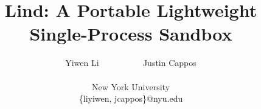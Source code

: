 \documentclass[letterpaper,twocolumn,10pt]{article}
\begin{document}




\title{\Large \bf Lind: A Portable Lightweight Single-Process Sandbox}

\author{
{\rm Yiwen Li ~~~~~~~~~ Justin Cappos}\\\\
New York University \\
\{liyiwen, jcappos\}@nyu.edu
} %


\maketitle

















{
\footnotesize 


}



\end{document}
